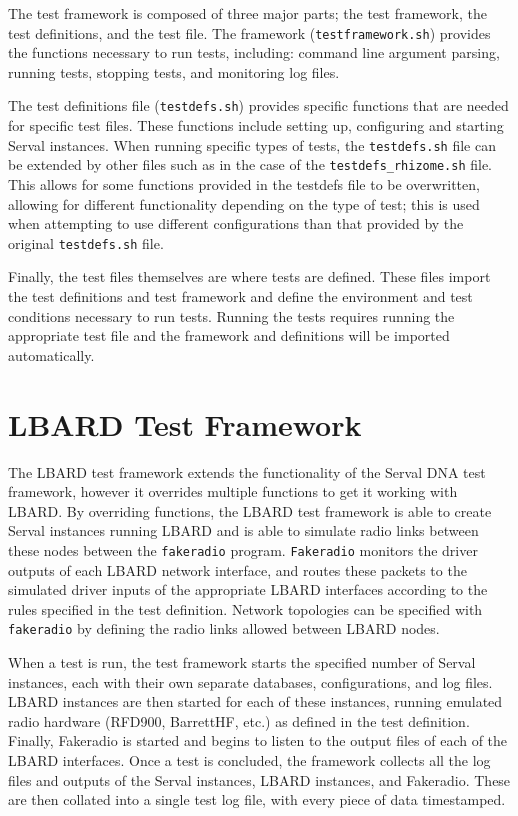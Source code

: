 The test framework is composed of three major parts; the test framework, the test definitions, and the test file.
The framework (\texttt{testframework.sh}) provides the functions necessary to run tests, including: command line argument parsing, running tests, stopping tests, and monitoring log files. 

The test definitions file (\texttt{testdefs.sh}) provides specific functions that are needed for specific test files.
These functions include setting up, configuring and starting Serval instances.
When running specific types of tests, the \texttt{testdefs.sh} file can be extended by other files such as in the case of the \texttt{testdefs\_rhizome.sh} file. 
This allows for some functions provided in the testdefs file to be overwritten, allowing for different functionality depending on the type of test; this is used when attempting to use different configurations than that provided by the original \texttt{testdefs.sh} file.

Finally, the test files themselves are where tests are defined. 
These files import the test definitions and test framework and define the environment and test conditions necessary to run tests. 
Running the tests requires running the appropriate test file and the framework and definitions will be imported automatically.

\section{LBARD Test Framework}
The LBARD test framework extends the functionality of the Serval DNA test framework, however it overrides multiple functions to get it working with LBARD.
By overriding functions, the LBARD test framework is able to create Serval instances running LBARD and is able to simulate radio links between these nodes between the \texttt{fakeradio} program.
\texttt{Fakeradio} monitors the driver outputs of each LBARD network interface, and routes these packets to the simulated driver inputs of the appropriate LBARD interfaces according to the rules specified in the test definition.
Network topologies can be specified with \texttt{fakeradio} by defining the radio links allowed between LBARD nodes.

When a test is run, the test framework starts the specified number of Serval instances, each with their own separate databases, configurations, and log files.
LBARD instances are then started for each of these instances, running emulated radio hardware (RFD900, BarrettHF, etc.) as defined in the test definition.
Finally, Fakeradio is started and begins to listen to the output files of each of the LBARD interfaces.
Once a test is concluded, the framework collects all the log files and outputs of the Serval instances, LBARD instances, and Fakeradio.
These are then collated into a single test log file, with every piece of data timestamped.

